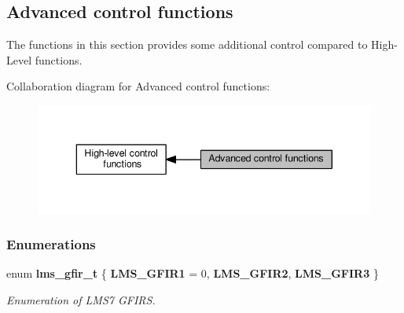 \subsection{Advanced control functions}
\label{group__FN__ADVANCED}


The functions in this section provides some additional control compared to High-\/\+Level functions.  


Collaboration diagram for Advanced control functions\+:
\nopagebreak
\begin{figure}[H]
\begin{center}
\leavevmode
\includegraphics[width=343pt]{dd/d0a/group__FN__ADVANCED}
\end{center}
\end{figure}
\subsubsection*{Enumerations}
\begin{DoxyCompactItemize}
\item 
enum {\bf lms\+\_\+gfir\+\_\+t} \{ {\bf L\+M\+S\+\_\+\+G\+F\+I\+R1} = 0, 
{\bf L\+M\+S\+\_\+\+G\+F\+I\+R2}, 
{\bf L\+M\+S\+\_\+\+G\+F\+I\+R3}
 \}\begin{DoxyCompactList}\small\item\em Enumeration of L\+M\+S7 G\+F\+I\+RS. \end{DoxyCompactList}
\end{DoxyCompactItemize}
